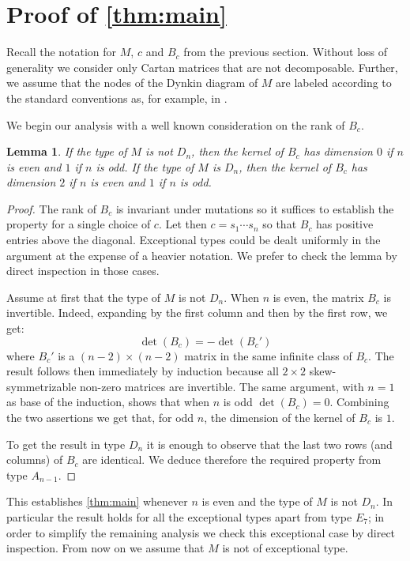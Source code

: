\documentclass[11pt]{amsart}
\newcommand{\A}{{M}}
\newtheorem{lemma}[theorem]{Lemma}
\theoremstyle{definition}
\numberwithin{equation}{section}
\numberwithin{figure}{section}
\begin{document}
\section{Proof of \cref{thm:main}}
\label{proof}
  Recall the notation for $\A$, $c$ and $B_c$ from the previous section. 
  Without loss of generality we consider only Cartan matrices that are not decomposable.
  Further, we assume that the nodes of the Dynkin diagram of $\A$ are labeled according to the standard conventions as, for example, in \cite[Table Fin.]{Kac90}.

  We begin our analysis with a well known consideration on the rank of $B_c$.
  \begin{lemma}
    \label{lem:dimensions}
    If the type of $\A$ is not $D_n$, then the kernel of $B_c$ has dimension $0$ if $n$ is even and $1$ if $n$ is odd.
    If the type of $\A$ is $D_n$, then the kernel of $B_c$ has dimension $2$ if $n$ is even and $1$ if $n$ is odd.
  \end{lemma}
  \begin{proof}
    The rank of $B_c$ is invariant under mutations so it suffices to establish the property for a single choice of $c$. 
    Let then $c=s_1\cdots s_n$ so that $B_c$ has positive entries above the diagonal.
    Exceptional types could be dealt uniformly in the argument at the expense of a heavier notation. 
    We prefer to check the lemma by direct inspection in those cases.

    Assume at first that the type of $\A$ is not $D_n$.
    When $n$ is even, the matrix $B_c$ is invertible. 
    Indeed, expanding by the first column and then by the first row, we get:
    \[
      \det(B_c)=-\det(B_c')
    \]
    where $B_c'$ is a $(n-2)\times(n-2)$ matrix in the same infinite class of $B_c$. 
    The result follows then immediately by induction because all $2\times2$ skew-symmetrizable non-zero matrices are invertible.
    The same argument, with $n=1$ as base of the induction, shows that when $n$ is odd $\det(B_c)=0$.
    Combining the two assertions we get that, for odd $n$, the dimension of the kernel of $B_c$ is $1$.

    To get the result in type $D_n$ it is enough to observe that the last two rows (and columns) of $B_c$ are identical. 
    We deduce therefore the required property from type $A_{n-1}$.
  \end{proof}

  This establishes \cref{thm:main} whenever $n$ is even and the type of $\A$ is not $D_n$.
  In particular the result holds for all the exceptional types apart from type $E_7$; in order to simplify the remaining analysis we check this exceptional case by direct inspection.
  From now on we assume that $\A$ is not of exceptional type.
\end{document}
